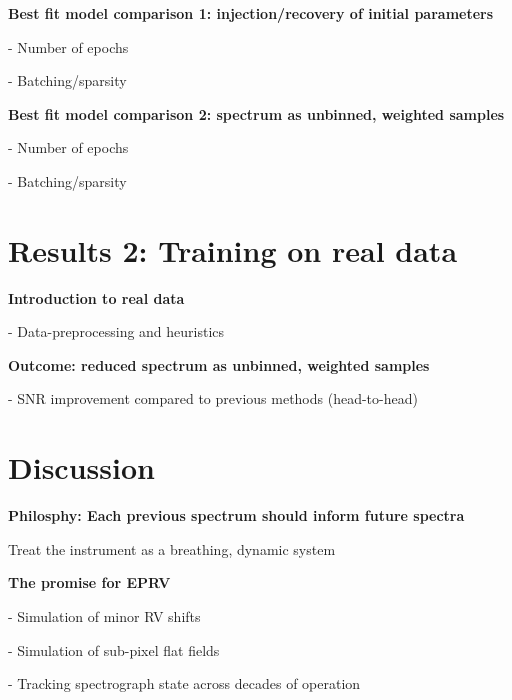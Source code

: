 \documentclass[twocolumn]{aastex631}
\begin{document}
\begin{mdframed}
  \textbf{Best fit model comparison 1: injection/recovery of initial parameters} \par
  - Number of epochs\par
  - Batching/sparsity\par
  \textcolor{lightgray}{\lipsum[10]}
\end{mdframed}

\begin{mdframed}
  \textbf{Best fit model comparison 2: spectrum as unbinned, weighted samples} \par
  - Number of epochs\par
  - Batching/sparsity\par
  \textcolor{lightgray}{\lipsum[11]}
\end{mdframed}


\section{Results 2: Training on real data}
\begin{mdframed}
  \textbf{Introduction to real data} \par
  - Data-preprocessing and heuristics \par
  \textcolor{lightgray}{\lipsum[12]}
\end{mdframed}

\begin{mdframed}
  \textbf{Outcome: reduced spectrum as unbinned, weighted samples} \par
  - SNR improvement compared to previous methods (head-to-head)\par
  \textcolor{lightgray}{\lipsum[13]}
\end{mdframed}

\pagebreak
\clearpage

\section{Discussion}\label{secDiscuss}

\begin{mdframed}
  \textbf{Philosphy: Each previous spectrum should inform future spectra} \par
  Treat the instrument as a breathing, dynamic system\par
  \textcolor{lightgray}{\lipsum[5]}
\end{mdframed}

\begin{mdframed}
  \textbf{The promise for EPRV} \par
  - Simulation of minor RV shifts\par
  - Simulation of sub-pixel flat fields \par
  - Tracking spectrograph state across decades of operation\par
  \textcolor{lightgray}{\lipsum[14]}
\end{mdframed}
\end{document}
